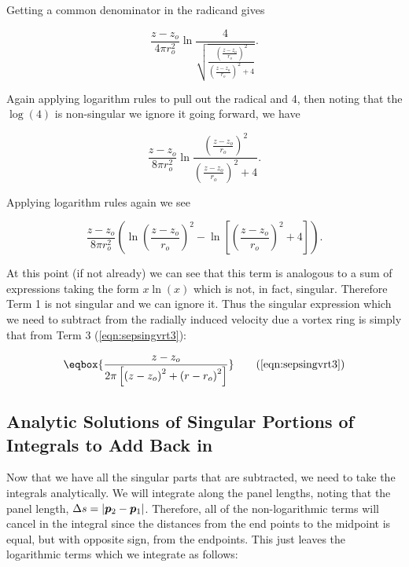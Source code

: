 \noindent Getting a common denominator in the radicand gives

\begin{equation}
    \frac{z-z_o}{4\pi r_o^2}\ln \frac{4}{\sqrt{\frac{\left(\frac{z-z_o}{r_o}\right)^2}{\left(\frac{z-z_o}{r_o}\right)^2 + 4}}}.
\end{equation}

\noindent Again applying logarithm rules to pull out the radical and 4, then noting that the \(\log(4)\) is non-singular we ignore it going forward, we have

\begin{equation}
    \frac{z-z_o}{8\pi r_o^2}\ln \frac{\left(\frac{z-z_o}{r_o}\right)^2}{\left(\frac{z-z_o}{r_o}\right)^2 + 4}.
\end{equation}

\noindent Applying logarithm rules again we see

\begin{equation}
\frac{z-z_o}{8\pi r_o^2}\left(\ln \left(\frac{z-z_o}{r_o}\right)^2 - \ln \left[\left(\frac{z-z_o}{r_o}\right)^2 + 4\right]\right).
\end{equation}

\noindent At this point (if not already) we can see that this term is analogous to a sum of expressions taking the form \(x \ln(x)\) which is not, in fact, singular.
%
Therefore Term 1 is not singular and we can ignore it.
%
Thus the singular expression which we need to subtract from the radially induced velocity due a vortex ring is simply that from Term 3 (\cref{eqn:sepsingvrt3}):

\begin{equation}
\eqbox{
    \frac{z-z_o}{2\pi\left[\left(z-z_o\right)^2 + \left(r-r_o\right)^2\right]}
}
\tag{\ref{eqn:sepsingvrt3}}
\end{equation}


\subsection{Analytic Solutions of Singular Portions of Integrals to Add Back in}

Now that we have all the singular parts that are subtracted, we need to take the integrals analytically.
%
We will integrate along the panel lengths, noting that the panel length, \(\Delta s = |\bm{p}_2 - \bm{p}_1|\).
%
Therefore, all of the non-logarithmic terms will cancel in the integral since the distances from the end points to the midpoint is equal, but with opposite sign, from the endpoints.
%
This just leaves the logarithmic terms which we integrate as follows:

